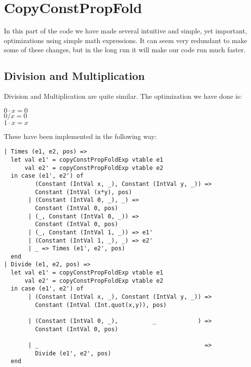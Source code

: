 \documentclass[12pt]{article}
\begin{document}
\section{CopyConstPropFold}
In this part of the code we have made several intuitive and simple, yet important, optimizations using simple math expressions. It can seem very redundant to make some of these changes, but in the long run it will make our code run much faster.

\subsection{Division and Multiplication}
Division and Multiplication are quite similar. The optimization we have done is:\\
\begin{center}
$0 \cdot x = 0$\\
$0/x = 0$\\
$1 \cdot x = x$
\end{center}
These have been implemented in the following way:
\begin{verbatim}
| Times (e1, e2, pos) =>
  let val e1' = copyConstPropFoldExp vtable e1
      val e2' = copyConstPropFoldExp vtable e2
  in case (e1', e2') of
         (Constant (IntVal x, _), Constant (IntVal y, _)) =>
         Constant (IntVal (x*y), pos)
       | (Constant (IntVal 0, _), _) =>
         Constant (IntVal 0, pos)
       | (_, Constant (IntVal 0, _)) =>
         Constant (IntVal 0, pos)
       | (_, Constant (IntVal 1, _)) => e1'
       | (Constant (IntVal 1, _), _) => e2'
       | _ => Times (e1', e2', pos)
  end
| Divide (e1, e2, pos) =>
  let val e1' = copyConstPropFoldExp vtable e1
      val e2' = copyConstPropFoldExp vtable e2
  in case (e1', e2') of
       | (Constant (IntVal x, _), Constant (IntVal y, _)) => 
         Constant (IntVal (Int.quot(x,y)), pos)

       | (Constant (IntVal 0, _),          _            ) => 
         Constant (IntVal 0, pos)
         
       | _                                                => 
         Divide (e1', e2', pos)
  end
\end{verbatim}
\end{document}
